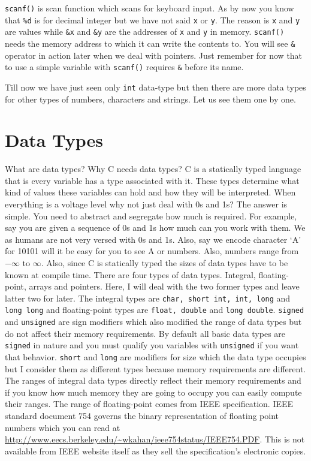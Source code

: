 \texttt{scanf()} is scan function which scans for keyboard input. As by now you
know that \texttt{\%d} is for decimal integer but we have not said \texttt{x}
or \texttt{y}. The reason is \texttt{x} and \texttt{y} are values while
\texttt{\&x} and \texttt{\&y} are the addresses of \texttt{x} and \texttt{y} in
memory. \texttt{scanf()} needs the memory address to which it can write the
contents to. You will see \texttt{\&} operator in action later when we deal
with pointers. Just remember for now that to use a simple variable with
\texttt{scanf()} requires \texttt{\&} before its name.

Till now we have just seen only \texttt{int} data-type but then there are more
data types for other types of numbers, characters and strings. Let us see them
one by one.

\section{Data Types}
What are data types? Why C needs data types? C is a statically typed language
that is every variable has a type associated with it. These types determine
what kind of values these variables can hold and how they will be interpreted.
When everything is a voltage level why not just deal with 0s and 1s? The answer
is simple. You need to abstract and segregate how much is required. For
example, say you are given a sequence of 0s and 1s how much can you work with
them. We as humans are not very versed with 0s and 1s. Also, say we encode
character `A' for 10101 will it be easy for you to see A or numbers. Also,
numbers range from $-\infty$ to $\infty$. Also, since C is statically typed the
sizes of data types have to be known at compile time. There are four types of
data types. Integral, floating-point, arrays and pointers. Here, I will deal
with the two former types and leave latter two for later. The integral types
are \texttt{char, short int, int, long} and \texttt{long long} and
floating-point types are \texttt{float, double} and \texttt{long
  double}. \texttt{signed} and \texttt{unsigned} are sign modifiers which also
modified the range of data types but do not affect their memory
requirements. By default all basic data types are \texttt{signed} in nature and
you must qualify you variables with \texttt{unsigned} if you want that
behavior. \texttt{short} and \texttt{long} are modifiers for size which the
data type occupies but I consider them as different types because memory
requirements are different. The ranges of integral data types directly reflect
their memory requirements and if you know how much memory they are going to
occupy you can easily compute their ranges. The range of floating-point comes
from IEEE specification. IEEE standard document 754 governs the binary
representation of floating point numbers which you can read at
\url{http://www.eecs.berkeley.edu/~wkahan/ieee754status/IEEE754.PDF}. This is
not available from IEEE website itself as they sell the specification's
electronic copies.

